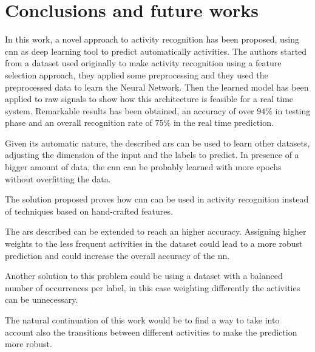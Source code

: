 \section{Conclusions and future works}
\label{sec:conclusions}

In this work, a novel approach to activity recognition has been proposed, using \gls{cnn} as deep learning tool to predict automatically activities.
The authors started from a dataset used originally to make activity recognition using a feature selection approach, they applied some preprocessing and they used the preprocessed data to learn the Neural Network.
Then the learned model has been applied to raw signals to show how this architecture is feasible for a real time system.
Remarkable results has been obtained, an accuracy of over $94\%$ in testing phase and an overall recognition rate of $75\%$ in the real time prediction.

Given its automatic nature, the described \gls{ars} can be used to learn other datasets, adjusting the dimension of the input and the labels to predict. In presence of a bigger amount of data, the \gls{cnn} can be probably learned with more epochs without overfitting the data.

The solution proposed proves how \gls{cnn} can be used in activity recognition instead of techniques based on hand-crafted features.

The \gls{ars} described can be extended to reach an higher accuracy.
Assigning higher weights to the less frequent activities in the dataset could lead to a more robust prediction and could increase the overall accuracy of the \gls{nn}.

Another solution to this problem could be using a dataset with a balanced number of occurrences per label, in this case weighting differently the activities can be unnecessary.

The natural continuation of this work would be to find a way to take into account also the transitions between different activities to make the prediction more robust.
